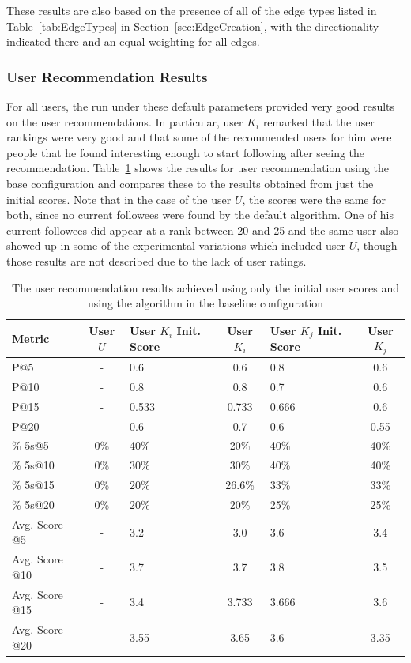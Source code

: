 These results are also based on the presence of all of the edge types listed in Table~\ref{tab:EdgeTypes} in Section~\ref{sec:EdgeCreation}, with the directionality indicated there and an equal weighting for all edges.


\subsubsection{User Recommendation Results}

For all users, the run under these default parameters provided very good results on the user recommendations. In particular, user $K_{i}$ remarked that the user rankings were very good and that some of the recommended users for him were people that he found interesting enough to start following after seeing the recommendation. Table~\ref{tab:BaseUserResults} shows the results for user recommendation using the base configuration and compares these to the results obtained from just the initial scores. Note that in the case of the user $U$, the scores were the same for both, since no current followees were found by the default algorithm. One of his current followees did appear at a rank between 20 and 25 and the same user also showed up in some of the experimental variations which included user $U$, though those results are not described due to the lack of user ratings.


\begin{table}
\centering
\begin{tabular}{l|c|p{2.25cm}|c|p{2.25cm}|c}
{\bf Metric} & {\bf User $U$} & {\bf User $K_{i}$ Init. Score} & {\bf User $K_{i}$} & {\bf User $K_{j}$ Init. Score} & {\bf User $K_{j}$} \\ \hline
P@5   & - & 0.6 & 0.6 & 0.8 & 0.6 \\ \hline
P@10 & - & 0.8 & 0.8 & 0.7 & 0.6 \\ \hline
P@15 & - & 0.533 & 0.733 & 0.666 & 0.6 \\ \hline
P@20 & - & 0.6 & 0.7 & 0.6 & 0.55 \\ \hline

\% 5s@5    & 0\% & 40\% & 20\% & 40\% & 40\% \\ \hline
\% 5s@10  & 0\% & 30\% & 30\% & 40\% & 40\% \\ \hline
\% 5s@15  & 0\% & 20\% & 26.6\% & 33\% & 33\% \\ \hline
\% 5s@20  & 0\% & 20\% & 20\% & 25\% & 25\% \\ \hline

Avg. Score @5   & - & 3.2 & 3.0 & 3.6 & 3.4 \\ \hline
Avg. Score @10 & - & 3.7 & 3.7 & 3.8 & 3.5 \\ \hline
Avg. Score @15 & - & 3.4 & 3.733 & 3.666 & 3.6 \\ \hline
Avg. Score @20 & - & 3.55 & 3.65 & 3.6 & 3.35 \\
\end{tabular}
\caption{The user recommendation results achieved using only the initial user scores and using the algorithm in the baseline configuration}
\label{tab:BaseUserResults}
\end{table}



